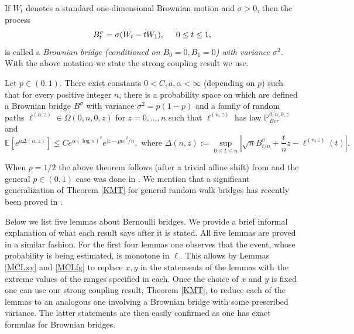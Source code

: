 If $W_t$ denotes a standard one-dimensional Brownian motion and $\sigma > 0$, then the process
$$B^{\sigma}_t = \sigma (W_t - t W_1), \hspace{5mm} 0 \leq t \leq 1,$$
is called a {\em Brownian bridge (conditioned on $B_0 = 0, B_1 = 0$)  with variance $\sigma^2$.}  With the above notation we state the strong coupling result we use.
\begin{theorem}\label{KMT}
Let $p \in (0,1)$. There exist constants $0 < C, a, \alpha < \infty$ (depending on $p$) such that for every positive integer $n$, there is a probability space on which are defined a Brownian bridge $B^\sigma$ with variance $\sigma^2 = p(1-p)$ and a family of random paths $\ell^{(n,z)} \in \Omega(0,n, 0, z)$ for $z = 0,\dots,n$ such that $\ell^{(n,z)}$ has law $\mathbb{P}^{0,n,0,z}_{Ber}$ and
\begin{equation}\label{KMTeq}
\mathbb{E}\left[ e^{a \Delta(n,z)} \right] \leq C e^{\alpha (\log n)^2}e^{|z- p n|^2/n}, \mbox{ where $\Delta(n,z):=  \sup_{0 \leq t \leq n} \left| \sqrt{n} B^\sigma_{t/n} + \frac{t}{n}z - \ell^{(n,z)}(t) \right|.$}
\end{equation}
\end{theorem}
\begin{remark} When $p = 1/2$ the above theorem follows (after a trivial affine shift) from \cite[Theorem 6.3]{LF} and the general $p \in (0,1)$ case was done in \cite[Theorem 4.5]{CD}. We mention that a significant generalization of Theorem \ref{KMT} for general random walk bridges has recently been proved in \cite[Theorem 2.3]{DW19}.
\end{remark}


Below we list five lemmas about Bernoulli bridges. We provide a brief informal explanation of what each result says after it is stated. All five lemmas are proved in a similar fashion. For the first four lemmas one observes that the event, whose probability is being estimated, is monotone in $\ell$. This allows by Lemmas \ref{MCLxy} and \ref{MCLfg} to replace $x,y$ in the statements of the lemmas with the extreme values of the ranges specified in each. Once the choice of $x$ and $y$ is fixed one can use our strong coupling result, Theorem \ref{KMT}, to reduce each of the lemmas to an analogous one involving a Brownian bridge with some prescribed variance. The latter statements are then easily confirmed as one has exact formulas for Brownian bridges.\\

